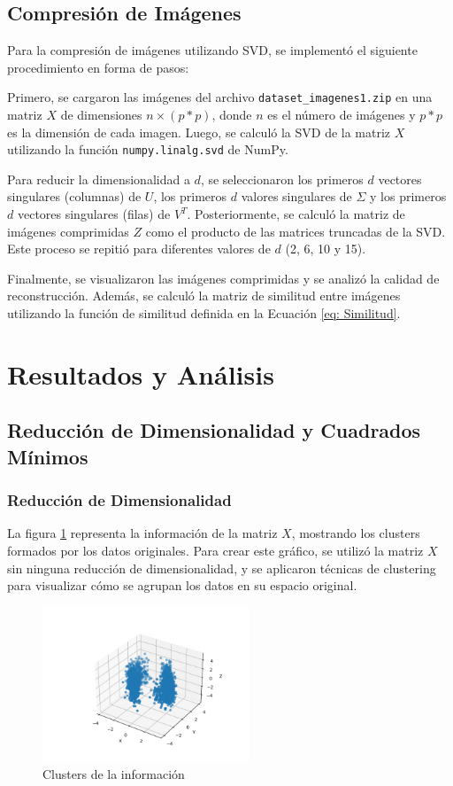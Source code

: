 \documentclass[12pt,a4]{article} %
\begin{document}
\subsection{Compresión de Imágenes}
Para la compresión de imágenes utilizando SVD, se implementó el siguiente procedimiento en forma de pasos:

Primero, se cargaron las imágenes del archivo \texttt{dataset\_imagenes1.zip} en una matriz $X$ de dimensiones $n \times (p * p)$, donde $n$ es el número de imágenes y $p * p$ es la dimensión de cada imagen. Luego, se calculó la SVD de la matriz $X$ utilizando la función \texttt{numpy.linalg.svd} de NumPy.

Para reducir la dimensionalidad a $d$, se seleccionaron los primeros $d$ vectores singulares (columnas) de $U$, los primeros $d$ valores singulares de $\Sigma$ y los primeros $d$ vectores singulares (filas) de $V^T$. Posteriormente, se calculó la matriz de imágenes comprimidas $Z$ como el producto de las matrices truncadas de la SVD. Este proceso se repitió para diferentes valores de $d$ (2, 6, 10 y 15).

Finalmente, se visualizaron las imágenes comprimidas y se analizó la calidad de reconstrucción. Además, se calculó la matriz de similitud entre imágenes utilizando la función de similitud definida en la Ecuación \ref{eq: Similitud}.




\section{Resultados y Análisis}
\subsection{Reducción de Dimensionalidad y Cuadrados Mínimos}
\subsubsection{Reducción de Dimensionalidad}

La figura \ref{fig:clusters_originals} representa la información de la matriz $X$, mostrando los clusters formados por los datos originales. Para crear este gráfico, se utilizó la matriz $X$ sin ninguna reducción de dimensionalidad, y se aplicaron técnicas de clustering para visualizar cómo se agrupan los datos en su espacio original.

\begin{figure}[H]
    \centering
    \includegraphics[width=0.55\textwidth]{latex_project/plots1/Clusters_informacion.png}
    \caption{Clusters de la información}
    \label{fig:clusters_originals}
\end{figure}
\end{document}
